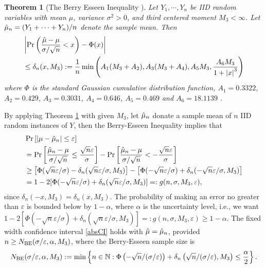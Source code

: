 \documentclass{iitthesis}
\newtheorem{theorem}{Theorem}[section]
\theoremstyle{definition}
\begin{document}

\begin{theorem}[The Berry Esseen Inequality {\cite[Theorem 3]{HJLO12}}]\label{BEThm}
Let $Y_1,\cdots,Y_n$ be IID random variables with mean $\mu$, variance $\sigma^2 >0$, and third centered moment $M_3 < \infty$. Let $\hat{\mu}_n = (Y_1+\cdots+Y_n)/n$ denote the sample mean. Then
\begin{align}
&\left \lvert \Pr\left(\frac{\hat{\mu}-\mu}{\sigma/\sqrt{n}}<x\right)-\Phi(x) \right \rvert \nonumber\\
& \leq \delta_n(x,M_3):=\frac{1}{n}\min\left( A_1(M_3+A_2),  A_3(M_3+A_4), A_5M_3, \frac{A_6M_3}{1+\left \lvert x \right \rvert^3}\right) \label{deltaBEconstant}
\end{align}
where $\Phi$ is the standard Gaussian cumulative distribution function, $A_1 = 0.3322$, $A_2 = 0.429$, $A_3=0.3031$, $A_4=0.646$, $A_5=0.469$ \cite{She13} and $A_6=18.1139$ \cite{NeShe12}.
\end{theorem}
By applying Theorem \ref{BEThm} with given $M_3$, let $\hat{\mu}_n$ donate a sample mean of $n$ IID random instances of $Y$, then the Berry-Esseen Inequality implies that
\begin{align} 
&\Pr\left[\left \lvert \mu-\hat{\mu}_n \right \rvert  \le \varepsilon \right]\nonumber\\
&=\Pr\left[\frac{\hat{\mu}_n - \mu}{\sigma/\sqrt{n}} \le \frac{\sqrt{n}\varepsilon}{\sigma} \right]-\Pr\left[\frac{\hat{\mu}_n - \mu}{\sigma/\sqrt{n}} < -\frac{\sqrt{n}\varepsilon}{\sigma}\right] \nonumber \\ 
&\ge \left[\Phi(\sqrt{n}\varepsilon/\sigma)-\delta_n(\sqrt{n}\varepsilon/\sigma,M_3)\right] -\left[\Phi(-\sqrt{n}\varepsilon/\sigma) + \delta_n(-\sqrt{n}\varepsilon/\sigma,M_3)\right] \nonumber \\
&=1-2[\Phi(-\sqrt{n}\varepsilon/\sigma) + \delta_n(\sqrt{n}\varepsilon/\sigma,M_3)] =: g(n, \sigma, M_3, \varepsilon), \label{BEresult}
\end{align}
since $\delta_n(-x,M_3)=\delta_n(x,M_3)$. The probability of
making an error no greater than $\varepsilon$ is bounded below by $1-\alpha$, where $\alpha$ is the uncertainty level, i.e., we want $1-2[\Phi(-\sqrt{n}\varepsilon/\sigma) + \delta_n(\sqrt{n}\varepsilon/\sigma,M_3)] =: g(n, \sigma, M_3, \varepsilon) \geq 1-\alpha$. The fixed width confidence interval \eqref{absCI} holds with $\hat{\mu}=\hat{\mu}_n$, provided $n \ge N_{\text{BE}}(\sigma/\varepsilon,\alpha,M_3)$, where the Berry-Esseen sample size is
\begin{equation}\label{NBE}
N_{\text{BE}}(\sigma/\varepsilon,\alpha,M_3) := \min  \left \{ n \in \mathbb{N} : \Phi\left(-\sqrt{n}/(\sigma /\varepsilon) \right)+\delta_n\left(\sqrt{n}/(\sigma /\varepsilon),M_3\right)
\le \frac{\alpha}{2} \right \}.
\end{equation}
\end{document}
